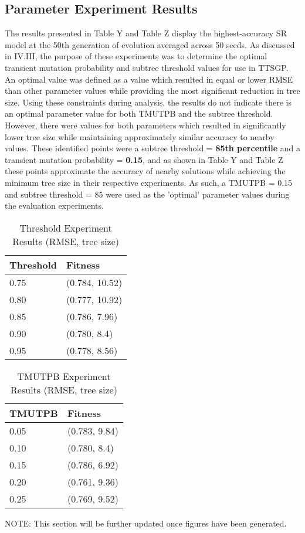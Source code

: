 \documentclass[a4paper, twocolumn]{article}
\begin{document}
\subsection{Parameter Experiment Results}
The results presented in Table Y and Table Z display the highest-accuracy SR model at the 50th generation of evolution averaged across 50 seeds. As discussed in IV.III, the purpose of these experiments was to determine the optimal transient mutation probability and subtree threshold values for use in TTSGP. An optimal value was defined as a value which resulted in equal or lower RMSE than other parameter values while providing the most significant reduction in tree size. 
\newline
Using these constraints during analysis, the results do not indicate there is an optimal parameter value for both TMUTPB and the subtree threshold. However, there were values for both parameters which resulted in significantly lower tree size while maintaining approximately similar accuracy to nearby values. These identified points were a subtree threshold = \textbf{85th percentile} and a transient mutation probability = \textbf{0.15}, and as shown in Table Y and Table Z these points approximate the accuracy of nearby solutions while achieving the minimum tree size in their respective experiments. As such, a TMUTPB = 0.15 and subtree threshold = 85 were used as the 'optimal' parameter values during the evaluation experiments.
\begin{table}[H]
	\begin{center}
		\caption{Threshold Experiment Results (RMSE, tree size)}
		\label{table:Y}
		\begin{tabularx}{\columnwidth}{X|X}
			Threshold&Fitness\\
			\hline
			0.75&(0.784, 10.52)\\
			0.80&(0.777, 10.92)\\
			0.85&(0.786, 7.96)\\
			0.90&(0.780, 8.4)\\
			0.95&(0.778, 8.56)\\
		\end{tabularx}
	\end{center}
\end{table}
\begin{table}[H]
	\begin{center}
		\caption{TMUTPB Experiment Results (RMSE, tree size)}
		\label{table:Z}
		\begin{tabularx}{\columnwidth}{X|X}
			TMUTPB&Fitness\\
			\hline
			0.05&(0.783, 9.84)\\
			0.10&(0.780, 8.4)\\
			0.15&(0.786, 6.92)\\
			0.20&(0.761, 9.36)\\
			0.25&(0.769, 9.52)\\
		\end{tabularx}
	\end{center}
\end{table}
NOTE: This section will be further updated once figures have been generated.
\end{document}
